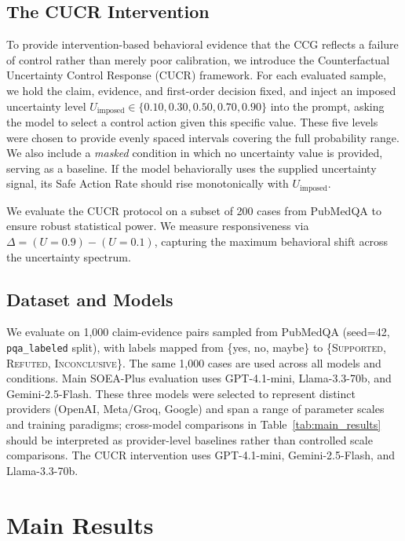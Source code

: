 \documentclass[11pt]{article}
\begin{document}
\subsection{The CUCR Intervention}
To provide intervention-based behavioral evidence that the CCG reflects a failure of control rather than merely poor calibration, we introduce the Counterfactual Uncertainty Control Response (CUCR) framework. For each evaluated sample, we hold the claim, evidence, and first-order decision fixed, and inject an imposed uncertainty level $U_{\text{imposed}} \in \{0.10, 0.30, 0.50, 0.70, 0.90\}$ into the prompt, asking the model to select a control action given this specific value. These five levels were chosen to provide evenly spaced intervals covering the full probability range. We also include a \textit{masked} condition in which no uncertainty value is provided, serving as a baseline. If the model behaviorally uses the supplied uncertainty signal, its Safe Action Rate should rise monotonically with $U_{\text{imposed}}$.

We evaluate the CUCR protocol on a subset of 200 cases from PubMedQA to ensure robust statistical power. We measure responsiveness via $\Delta = (U=0.9) - (U=0.1)$, capturing the maximum behavioral shift across the uncertainty spectrum.

\subsection{Dataset and Models}
We evaluate on 1,000 claim-evidence pairs sampled from PubMedQA \citep{jin2019pubmedqa} (seed=42, \texttt{pqa\_labeled} split), with labels mapped from \{yes, no, maybe\} to \{\textsc{Supported}, \textsc{Refuted}, \textsc{Inconclusive}\}. The same 1,000 cases are used across all models and conditions. Main SOEA-Plus evaluation uses GPT-4.1-mini, Llama-3.3-70b, and Gemini-2.5-Flash. These three models were selected to represent distinct providers (OpenAI, Meta/Groq, Google) and span a range of parameter scales and training paradigms; cross-model comparisons in Table~\ref{tab:main_results} should be interpreted as provider-level baselines rather than controlled scale comparisons. The CUCR intervention uses GPT-4.1-mini, Gemini-2.5-Flash, and Llama-3.3-70b.

\section{Main Results}
\end{document}
